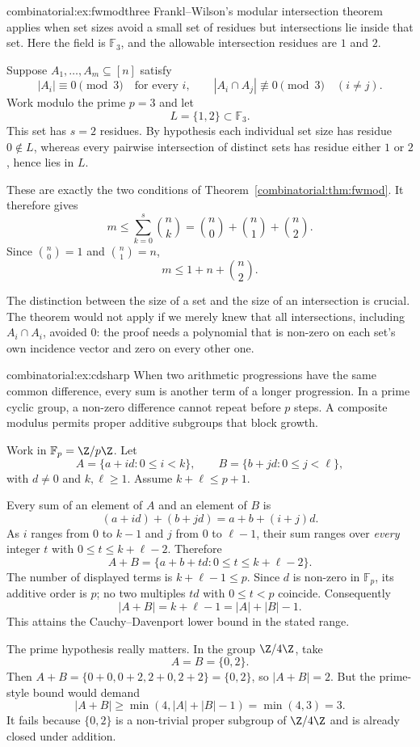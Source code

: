 \begin{solution}{combinatorial:ex:fwmodthree}
\idea Frankl--Wilson's modular intersection theorem applies when set sizes avoid a small set of residues but intersections lie inside that set. Here the field is $\mathbb F_3$, and the allowable intersection residues are $1$ and $2$.

\writeup Suppose $A_1,\ldots,A_m\subseteq[n]$ satisfy
\[
|A_i|\equiv0\pmod3
\quad\text{for every }i,
\qquad
|A_i\cap A_j|\not\equiv0\pmod3
\quad(i\ne j).
\]
Work modulo the prime $p=3$ and let
\[
L=\{1,2\}\subset\mathbb F_3.
\]
This set has $s=2$ residues. By hypothesis each individual set size has residue $0\notin L$, whereas every pairwise intersection of distinct sets has residue either $1$ or $2$, hence lies in $L$.

These are exactly the two conditions of Theorem~\ref{combinatorial:thm:fwmod}. It therefore gives
\[
m\le\sum_{k=0}^s\binom nk
=\binom n0+\binom n1+\binom n2.
\]
Since $\binom n0=1$ and $\binom n1=n$,
\[
\boxed{m\le1+n+\binom n2}.
\]

The distinction between the size of a set and the size of an intersection is crucial. The theorem would not apply if we merely knew that all intersections, including $A_i\cap A_i$, avoided $0$: the proof needs a polynomial that is non-zero on each set's own incidence vector and zero on every other one.
\end{solution}

\begin{solution}{combinatorial:ex:cdsharp}
\idea When two arithmetic progressions have the same common difference, every sum is another term of a longer progression. In a prime cyclic group, a non-zero difference cannot repeat before $p$ steps. A composite modulus permits proper additive subgroups that block growth.

\writeup Work in $\mathbb F_p=\Z/p\Z$. Let
\[
A=\{a+id:0\le i<k\},\qquad
B=\{b+jd:0\le j<\ell\},
\]
with $d\ne0$ and $k,\ell\ge1$. Assume $k+\ell\le p+1$.

Every sum of an element of $A$ and an element of $B$ is
\[
(a+id)+(b+jd)=a+b+(i+j)d.
\]
As $i$ ranges from $0$ to $k-1$ and $j$ from $0$ to $\ell-1$, their sum ranges over \emph{every} integer $t$ with $0\le t\le k+\ell-2$. Therefore
\[
A+B=\{a+b+td:0\le t\le k+\ell-2\}.
\]
The number of displayed terms is $k+\ell-1\le p$. Since $d$ is non-zero in $\mathbb F_p$, its additive order is $p$; no two multiples $td$ with $0\le t<p$ coincide. Consequently
\[
\boxed{|A+B|=k+\ell-1=|A|+|B|-1}.
\]
This attains the Cauchy--Davenport lower bound in the stated range.

The prime hypothesis really matters. In the group $\Z/4\Z$, take
\[
A=B=\{0,2\}.
\]
Then $A+B=\{0+0,0+2,2+0,2+2\}=\{0,2\}$, so $|A+B|=2$. But the prime-style bound would demand
\[
|A+B|\ge\min(4,|A|+|B|-1)=\min(4,3)=3.
\]
It fails because $\{0,2\}$ is a non-trivial proper subgroup of $\Z/4\Z$ and is already closed under addition.
\end{solution}


